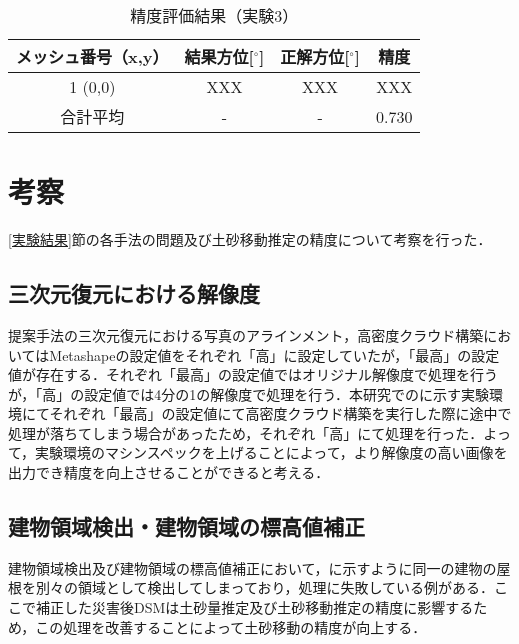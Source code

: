     \begin{table}[b]
      \centering
      \caption{精度評価結果（実験3）}
      \label{精度評価結果（実験3）}
      \begin{tabular}{cccc}
        \hline
        \textbf{メッシュ番号（x,y）} & \textbf{結果方位[$^{\circ}$]} & \textbf{正解方位[$^{\circ}$]} & \textbf{精度} \\
        \hline  \hline
        1  (0,0)  & XXX & XXX & XXX \\
        合計平均 & - & - & 0.730 \\
        \hline
      \end{tabular}
    \end{table}



  \section{考察}
    \label{考察}
    \ref{実験結果}節の各手法の問題及び土砂移動推定の精度について考察を行った．


    \subsection*{三次元復元における解像度}
      提案手法の三次元復元における写真のアラインメント，高密度クラウド構築においてはMetashapeの設定値をそれぞれ「高」に設定していたが，「最高」の設定値が存在する．それぞれ「最高」の設定値ではオリジナル解像度で処理を行うが，「高」の設定値では4分の1の解像度で処理を行う．本研究でのに示す実験環境にてそれぞれ「最高」の設定値にて高密度クラウド構築を実行した際に途中で処理が落ちてしまう場合があったため，それぞれ「高」にて処理を行った．よって，実験環境のマシンスペックを上げることによって，より解像度の高い画像を出力でき精度を向上させることができると考える．


    \subsection*{建物領域検出・建物領域の標高値補正}
      建物領域検出及び建物領域の標高値補正において，に示すように同一の建物の屋根を別々の領域として検出してしまっており，処理に失敗している例がある．ここで補正した災害後DSMは土砂量推定及び土砂移動推定の精度に影響するため，この処理を改善することによって土砂移動の精度が向上する．
      
